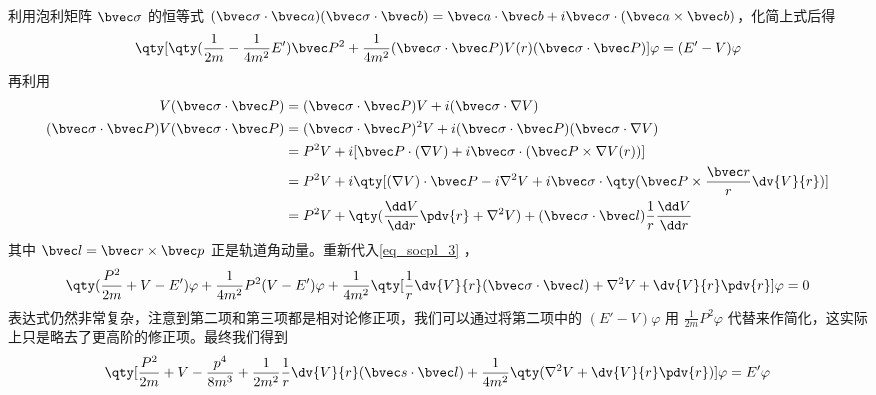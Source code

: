 利用泡利矩阵 $\bvec \sigma$ 的恒等式  $(\bvec \sigma\cdot \bvec a)(\bvec \sigma\cdot \bvec b)=\bvec a\cdot \bvec b+i\bvec \sigma\cdot (\bvec a\times \bvec b)$，化简上式后得
\begin{equation}\label{eq_socpl_3}
\qty[\qty(\frac{1}{2m}-\frac{1}{4m^2}E')\bvec P^2+\frac{1}{4m^2}(\bvec \sigma\cdot \bvec P)V(r)(\bvec \sigma\cdot \bvec P)]\varphi=(E'-V)\varphi
\end{equation}
再利用
\begin{equation}
\begin{aligned}
V(\bvec \sigma\cdot \bvec P)&=(\bvec \sigma\cdot \bvec P)V+i (\bvec \sigma\cdot \nabla V)\\
(\bvec \sigma\cdot \bvec P)V(\bvec \sigma\cdot \bvec P)&=(\bvec \sigma\cdot \bvec P)^2 V+i (\bvec \sigma\cdot \bvec P)(\bvec \sigma\cdot \nabla V)\\
&=P^2 V+i [\bvec P\cdot (\nabla V)+i\bvec \sigma \cdot (\bvec P\times \nabla V(r))]\\
&=P^2V+i\qty[(\nabla V)\cdot \bvec P-i\nabla^2 V+i\bvec \sigma\cdot\qty(\bvec P\times \frac{\bvec r}{r}\dv{V}{r})]\\
&=P^2V+\qty(\frac{\dd V}{\dd r}\pdv{r} + \nabla^2 V)+(\bvec \sigma\cdot \bvec l)\frac{1}{r}\frac{\dd V}{\dd r}
\end{aligned}
\end{equation}
其中 $\bvec l=\bvec r\times \bvec p$ 正是轨道角动量。重新代入\autoref{eq_socpl_3} ，
\begin{equation}
\qty(\frac{P^2}{2m}+V-E')\varphi+\frac{1}{4m^2}P^2(V-E')\varphi + \frac{1}{4m^2}\qty[\frac{1}{r}\dv{V}{r}(\bvec \sigma\cdot\bvec l)+\nabla^2 V+\dv{V}{r}\pdv{r}]\varphi = 0
\end{equation}
表达式仍然非常复杂，注意到第二项和第三项都是相对论修正项，我们可以通过将第二项中的 $(E'-V)\varphi$ 用 $\frac{1}{2m}P^2\varphi$ 代替来作简化，这实际上只是略去了更高阶的修正项。最终我们得到
\begin{equation}
\qty[\frac{P^2}{2m}+V-\frac{p^4}{8m^3}+\frac{1}{2m^2}\frac{1}{r}\dv{V}{r}(\bvec s\cdot \bvec l)+\frac{1}{4m^2}\qty(\nabla^2 V+\dv{V}{r}\pdv{r})]\varphi = E'\varphi
\end{equation}

